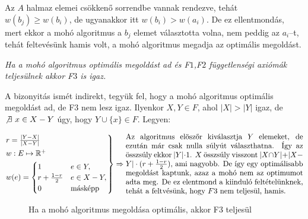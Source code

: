 Az $A$ halmaz elemei csökkenő sorrendbe vannak rendezve, tehát $w(b_j) \geq
	w(b_i)$, de ugyanakkor itt $w(b_i) > w(a_i)$. De ez ellentmondás, mert ekkor a
mohó algoritmus a $b_j$ elemet választotta volna, nem peddig az $a_i$--t, tehát
feltevésünk hamis volt, a mohó algoritmus megadja az optimális megoldást.

\vspace{0.4cm}
\emph{Ha a mohó algoritmus optimális megoldást ad és F$1$,F$2$ függetlenségi axiómák
	teljesülnek akkor F$3$ is igaz.}
\vspace{0.4cm}

A bizonyitás ismét indirekt, tegyük fel, hogy a mohó algoritmus optimális megoldást ad, de
F$3$ nem lesz igaz. Ilyenkor $X,Y \in F$, ahol $|X|>|Y|$ igaz, de $\not \exists~x \in X-Y$ úgy, hogy
$Y \cup \{x\} \in F$. Legyen:

\[
	\begin{rcases}
		r=\frac{|Y-X|}{|X-Y|}      \\
		w : E \mapsto \mathbb{R}^+ \\
		w(e) = \begin{cases}
			       1                 & e \in Y,       \\
			       r + \frac{1-r}{2} & e \in X-Y,     \\
			       0                 & \mbox{másképp}
		       \end{cases}
	\end{rcases}\Rightarrow
	\parbox[L]{8.25cm}{
	Az algoritmus elöszőr kiválasztja $Y$ elemeket, de ezután már csak nulla súlyút
	választhatna. Így az összsúly ekkor $|Y|\cdot 1$. $X$ összsúly visszont $|X \cap %
Y| + |X-Y|\cdot(r+\frac{1-r}{2})$, ami nagyobb. De így egy optimálisabb megoldást
	kaptunk, azaz a mohó nem az optimumot adta meg. De ez elentmond a kiinduló feltételünknek,
	tehát a feltvésünk, hogy $F$3 nem teljesül, hamis. } \]

\begin{figure}[htbp]
	\centering
	\caption{Ha a mohó algoritmus megoldása optimális, akkor F3 teljesül}\label{fig:Mohó}
\end{figure}

